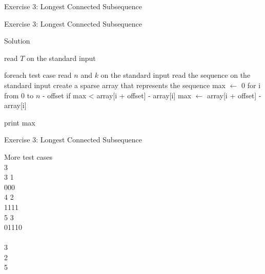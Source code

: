\documentclass{beamer}
\begin{document}
\begin{frame}{Exercise 3: Longest Connected Subsequence}
\begin{overlayarea}{\textwidth}{\textheight}

  \end{overlayarea}
\end{frame}

\begin{frame}[fragile]{Exercise 3: Longest Connected Subsequence}

  \begin{code}{Solution}
    \begin{PseudoCode}
read $T$ on the standard input

foreach test case
    read $n$ and $k$ on the standard input
    read the sequence on the standard input
    create a sparse array that represents the sequence
    max $\leftarrow$ 0
    for i from 0 to $n$ - offset
        if max < array[i + offset] - array[i]
            max $\leftarrow$ array[i + offset] - array[i]

print max
    \end{PseudoCode}
  \end{code}
\end{frame}

\begin{frame}{Exercise 3: Longest Connected Subsequence}

  \begin{exampleblock}{More test cases}
    \\
    3\\3 1\\000\\
    4 2\\1111\\
    5 3\\01110\\

    \medskip
    \\
    3\\2\\5
  \end{exampleblock}
\end{frame}
\end{document}
